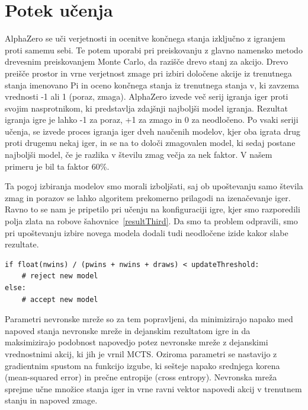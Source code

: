 \documentclass[a4paper, 12pt]{book}
\begin{document}
\section{Potek učenja}
\label{potekUcenja}
AlphaZero se uči verjetnosti in ocenitve končnega stanja izključno z igranjem proti samemu sebi. 
Te potem uporabi pri preiskovanju z glavno namensko metodo drevesnim preiskovanjem Monte Carlo, da razišče drevo stanj za akcijo.
Drevo preišče prostor in vrne verjetnost zmage pri izbiri določene akcije iz trenutnega stanja imenovano Pi in oceno končnega stanja iz trenutnega stanja v, ki zavzema vrednosti -1 ali 1 (poraz, zmaga).
AlphaZero izvede več serij igranja iger proti svojim nasprotnikom, ki predstavlja zdajšnji najboljši model igranja.
Rezultat igranja igre je lahko -1 za poraz, +1 za zmago in 0 za neodločeno.
Po vsaki seriji učenja, se izvede proces igranja iger dveh naučenih modelov, kjer oba igrata drug proti drugemu nekaj iger, in se na to določi zmagovalen model, ki sedaj postane najboljši model, če je razlika v številu zmag večja za nek faktor. V našem primeru je bil ta faktor 60\%.

Ta pogoj izbiranja modelov smo morali izboljšati, saj ob upoštevanju samo števila zmag in porazov se lahko algoritem prekomerno prilagodi na izenačevanje iger.
Ravno to se nam je pripetilo pri učenju na konfiguraciji igre, kjer smo razporedili polja zlata na robove šahovnice~\ref{resultThird}.
Da smo ta problem odpravili, smo pri upoštevanju izbire novega modela dodali tudi neodločene izide kakor slabe rezultate.
\begin{verbatim}
if float(nwins) / (pwins + nwins + draws) < updateThreshold:
    # reject new model
else:
    # accept new model
\end{verbatim}

Parametri nevronske mreže so za tem popravljeni, da minimizirajo napako med napoved stanja nevronske mreže in dejanskim rezultatom igre in da maksimizirajo podobnost napovedjo potez nevronske mreže z dejanskimi vrednostnimi akcij, ki jih je vrnil MCTS. 
Oziroma parametri se nastavijo z gradientnim spustom na funkcijo izgube, ki sešteje napako srednjega korena (mean-squared error) in prečne entropije (cross entropy).
Nevronska mreža sprejme učne množice stanja iger in vrne ravni vektor napovedi akcij v trenutnem stanju in napoved zmage.
\end{document}
